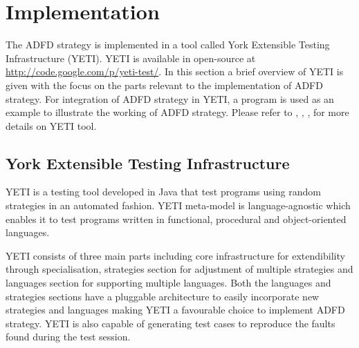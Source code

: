 


\section{Implementation}\label{sec:implementation}
The ADFD strategy is implemented in a tool called York Extensible Testing Infrastructure (YETI). YETI is available in open-source at \url{http://code.google.com/p/yeti-test/}. In this section a brief overview of YETI is given with the focus on the parts relevant to the implementation of ADFD strategy. For integration of ADFD strategy in YETI, a program is used as an example to illustrate the working of ADFD strategy. Please refer to  \cite{Oriol2011},  \cite{Oriol2012}, \cite{Oriol2010}, \cite{Oriol2010b} for more details on YETI tool.

 \subsection{York Extensible Testing Infrastructure}
YETI is a testing tool developed in Java that test programs using random strategies in an automated fashion. YETI meta-model is language-agnostic which enables it to test programs written in functional, procedural and object-oriented languages.

YETI consists of three main parts including core infrastructure for extendibility through specialisation, strategies section for adjustment of multiple strategies and languages section for supporting multiple languages. Both the languages and strategies sections have a pluggable architecture to easily incorporate new strategies and languages making YETI a favourable choice to implement ADFD strategy. YETI is also capable of generating test cases to reproduce the faults found during the test session.
 
